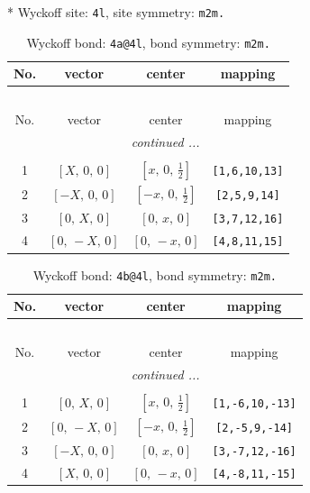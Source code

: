 \documentclass[fleqn,8pt]{jsarticle}
\begin{document}
* Wyckoff site: {\tt 4l}, site symmetry: {\tt m2m.}
\renewcommand{\arraystretch}{1.2}
\begin{longtable}{cccc}
\caption{Wyckoff bond: {\tt 4a@4l}, bond symmetry: {\tt m2m.}}
 \\
 \hline \hline
No. & vector & center & mapping \\ \hline \endfirsthead

\multicolumn{3}{l}{\tablename\ \thetable{}} \\
 \hline \hline
No. & vector & center & mapping \\ \hline \endhead

 \hline \hline
\multicolumn{3}{r}{\footnotesize\it continued ...} \\ \endfoot

 \hline \hline
\multicolumn{3}{r}{} \\ \endlastfoot

1 & $\left[ X,\, 0,\, 0 \right]$ & $\left[ x,\, 0,\, \frac{1}{2} \right]$ & {\tt [1,6,10,13]} \\ \hline
2 & $\left[ - X,\, 0,\, 0 \right]$ & $\left[ - x,\, 0,\, \frac{1}{2} \right]$ & {\tt [2,5,9,14]} \\ \hline
3 & $\left[ 0,\, X,\, 0 \right]$ & $\left[ 0,\, x,\, 0 \right]$ & {\tt [3,7,12,16]} \\ \hline
4 & $\left[ 0,\, - X,\, 0 \right]$ & $\left[ 0,\, - x,\, 0 \right]$ & {\tt [4,8,11,15]} \\
\end{longtable}
\renewcommand{\arraystretch}{1.2}
\begin{longtable}{cccc}
\caption{Wyckoff bond: {\tt 4b@4l}, bond symmetry: {\tt m2m.}}
 \\
 \hline \hline
No. & vector & center & mapping \\ \hline \endfirsthead

\multicolumn{3}{l}{\tablename\ \thetable{}} \\
 \hline \hline
No. & vector & center & mapping \\ \hline \endhead

 \hline \hline
\multicolumn{3}{r}{\footnotesize\it continued ...} \\ \endfoot

 \hline \hline
\multicolumn{3}{r}{} \\ \endlastfoot

1 & $\left[ 0,\, X,\, 0 \right]$ & $\left[ x,\, 0,\, \frac{1}{2} \right]$ & {\tt [1,-6,10,-13]} \\ \hline
2 & $\left[ 0,\, - X,\, 0 \right]$ & $\left[ - x,\, 0,\, \frac{1}{2} \right]$ & {\tt [2,-5,9,-14]} \\ \hline
3 & $\left[ - X,\, 0,\, 0 \right]$ & $\left[ 0,\, x,\, 0 \right]$ & {\tt [3,-7,12,-16]} \\ \hline
4 & $\left[ X,\, 0,\, 0 \right]$ & $\left[ 0,\, - x,\, 0 \right]$ & {\tt [4,-8,11,-15]} \\
\end{longtable}
\end{document}
